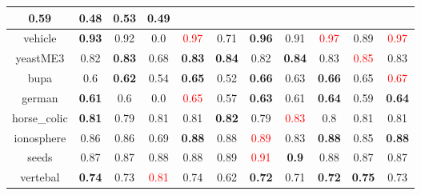 \documentclass{article}%
\begin{document}
\begin{tabular}{c|cccccccccc}
{0.59
}&0.48&\textbf{0.53}&0.49\\%
\hline%
vehicle&\textbf{0.93}&0.92&0.0&\textcolor{red}{ 
0.97
}&0.71&\textbf{0.96}&0.91&\textcolor{red}{ 
0.97
}&0.89&\textcolor{red}{ 
0.97
}\\%
\hline%
yeastME3&0.82&\textbf{0.83}&0.68&\textbf{0.83}&\textbf{0.84}&0.82&\textbf{0.84}&0.83&\textcolor{red}{ 
0.85
}&0.83\\%
\hline%
bupa&0.6&\textbf{0.62}&0.54&\textbf{0.65}&0.52&\textbf{0.66}&0.63&\textbf{0.66}&0.65&\textcolor{red}{ 
0.67
}\\%
\hline%
german&\textbf{0.61}&0.6&0.0&\textcolor{red}{ 
0.65
}&0.57&\textbf{0.63}&0.61&\textbf{0.64}&0.59&\textbf{0.64}\\%
\hline%
horse\_colic&\textbf{0.81}&0.79&0.81&0.81&\textbf{0.82}&0.79&\textcolor{red}{ 
0.83
}&0.8&0.81&0.81\\%
\hline%
ionosphere&0.86&0.86&0.69&\textbf{0.88}&0.88&\textcolor{red}{ 
0.89
}&0.83&\textbf{0.88}&0.85&\textbf{0.88}\\%
\hline%
seeds&0.87&0.87&0.88&0.88&0.89&\textcolor{red}{ 
0.91
}&\textbf{0.9}&0.88&0.87&0.87\\%
\hline%
vertebal&\textbf{0.74}&0.73&\textcolor{red}{ 
0.81
}&0.74&0.62&\textbf{0.72}&0.71&\textbf{0.72}&\textbf{0.75}&0.73\\%
\hline%
\end{tabular}

%
\end{document}
